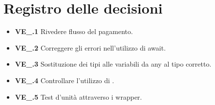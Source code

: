 \section{Registro delle decisioni}
\begin{itemize}
	\item \textbf{VE\_\Data.1} Rivedere flusso del pagamento.
   \item \textbf{VE\_\Data.2} Correggere gli errori nell'utilizzo di await.
   \item \textbf{VE\_\Data.3} Sostituzione dei tipi alle variabili da any al tipo corretto.
   \item \textbf{VE\_\Data.4} Controllare l'utilizzo di .
   \item \textbf{VE\_\Data.5} Test d'unità attraverso i wrapper.
\end{itemize}